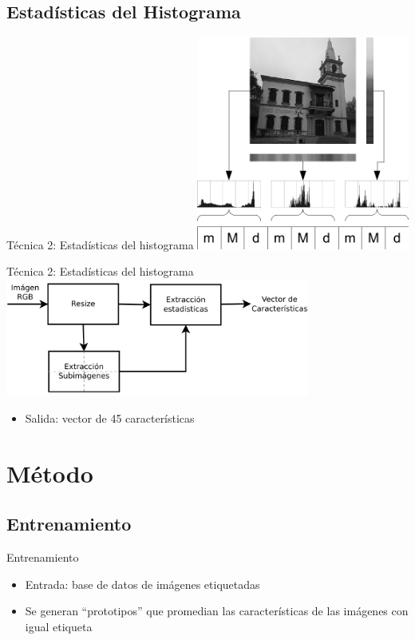 \documentclass[spanish]{beamer}
\begin{document}
\subsection{Estadísticas del Histograma}
\begin{frame}{Técnica 2: Estadísticas del histograma}
   \includegraphics[width=7cm]{img/ext-histog}
\end{frame}
\begin{frame}{Técnica 2: Estadísticas del histograma}
  \includegraphics[width=10cm]{../diagramas/procesoestadisticas}
  \begin{itemize}
  \item Salida: vector de 45 características
  \end{itemize}
\end{frame}
%
\section{Método}
%
\subsection{Entrenamiento}
\begin{frame}{Entrenamiento}
  \begin{itemize}
  \item Entrada: base de datos de imágenes etiquetadas
  \item Se generan ``prototipos'' que promedian las características de las
    imágenes con igual etiqueta
  \end{itemize}
\end{frame}
%
\end{document}
